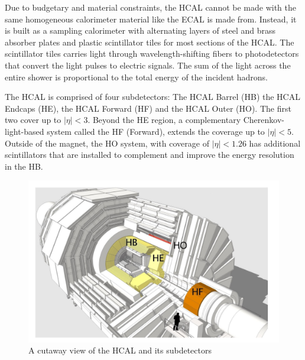Due to budgetary and material constraints, the HCAL cannot be made with the same homogeneous calorimeter material like the ECAL is made from. Instead, it is built as a sampling calorimeter with alternating layers of steel and brass absorber plates and plastic scintillator tiles for most sections of the HCAL. The scintillator tiles carries light through wavelength-shifting fibers to photodetectors that convert the light pulses to electric signals. The sum of the light across the entire shower is proportional to the total energy of the incident hadrons. 

The HCAL is comprised of four subdetectors: The HCAL Barrel (HB) the HCAL Endcaps (HE), the HCAL Forward (HF) and the HCAL Outer (HO). The first two cover up to $|\eta| < 3$. Beyond the HE region, a complementary Cherenkov-light-based system called the HF (Forward), extends the coverage up to $|\eta| <5$. Outside of the magnet, the HO system, with coverage of $|\eta| < 1.26$ has additional scintillators that are installed to complement and improve the energy resolution in the HB. 

\begin{figure}[tbp!]
\begin{center}
\includegraphics[scale=0.6]{fig/LabelledHCAL.png}
\end{center}
\caption{A cutaway view of the HCAL and its subdetectors~\cite{Chatrchyan:2008aa}
}
\label{fig:HCAL}
\end{figure}



